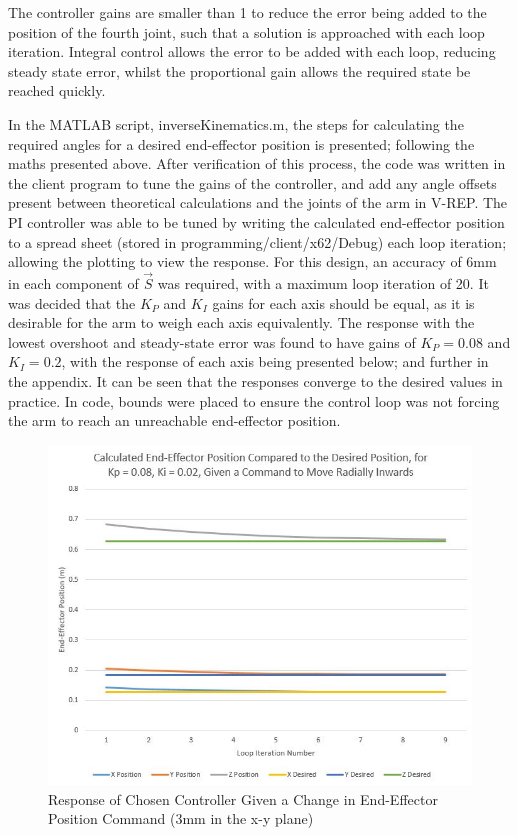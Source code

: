 \documentclass[12pt,openany,a4paper]{book}
\begin{document}
The controller gains are smaller than 1 to reduce the error being added to the position of the fourth joint, such that a solution is approached with each loop iteration. Integral control allows the error to be added with each loop, reducing steady state error, whilst the proportional gain allows the required state be reached quickly.

In the MATLAB script, inverseKinematics.m, the steps for calculating the required angles for a desired end-effector position is presented; following the maths presented above. After verification of this process, the code was written in the client program to tune the gains of the controller, and add any angle offsets present between theoretical calculations and the joints of the arm in V-REP. The PI controller was able to be tuned by writing the calculated end-effector position to a spread sheet (stored in programming/client/x62/Debug) each loop iteration; allowing the plotting to view the response. For this design, an accuracy of 6mm in each component of $\vec{S}$ was required, with a maximum loop iteration of 20. It was decided that the $K_P$ and $K_I$ gains for each axis should be equal, as it is desirable for the arm to weigh each axis equivalently. The response with the lowest overshoot and steady-state error was found to have gains of $K_P = 0.08$ and $K_I = 0.2$, with the response of each axis being presented below; and further in the appendix. It can be seen that the responses converge to the desired values in practice. In code, bounds were placed to ensure the control loop was not forcing the arm to reach an unreachable end-effector position.

\begin{center}
\begin{figure}[htb]
  \includegraphics[width=1\linewidth]{des_act_inv1_plot.jpg}
\caption{Response of Chosen Controller Given a Change in End-Effector Position Command (3mm in the x-y plane)}
\end{figure}
\end{center}
\end{document}
